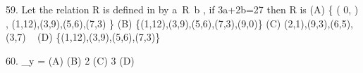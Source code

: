59. Let the relation R is defined in  by a~R~b , if 3a+2b=27 then R is
(A) \left\{ \left( 0, \right) , (1,12),(3,9),(5,6),(7,3) \right\} \qquad (B) \{(1,12),(3,9),(5,6),(7,3),(9,0)\}
(C) {(2,1),(9,3),(6,5),(3,7)} \qquad \qquad \qquad \qquad ~ (D) \{(1,12),(3,9),(5,6),(7,3)\}

60. \lim_{y } =
(A)  \qquad \qquad \qquad \qquad \qquad (B) 2
(C) 3 \qquad \qquad \qquad \qquad \qquad (D) 

